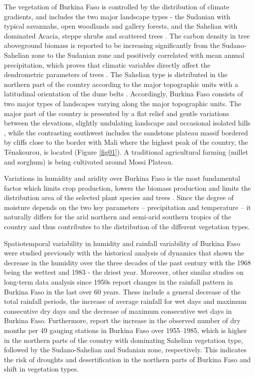 \documentclass[knowledge,article,submit,pdftex,moreauthors]{Definitions/mdpi}
\begin{document}
The vegetation of Burkina Faso is controlled by the distribution of climate gradients, and includes the two major landscape types - the Sudanian with typical savannahs, open woodlands and gallery forests, and the Sahelian with dominated Acacia, steppe shrubs and scattered trees \cite{da2010spatial}. The carbon density in tree aboveground biomass is reported to be increasing significantly from the Sudano-Sahelian zone to the Sudanian zone and positively correlated with mean annual precipitation, which proves that climatic variables directly affect the dendrometric parameters of trees \cite{BALIMA2021100123}. The Sahelian type is distributed in the northern part of the country according to the major topographic units with a latitudinal orientation of the dune belts \cite{Ballouche}. Accordingly, Burkina Faso consists of two major types of landscapes varying along the major topographic units. The major part of the country is presented by a flat relief and gentle variations between the elevations, slightly undulating landscape and occasional isolated hills \cite{Nebie}, while the contrasting southwest includes the sandstone plateau massif bordered by cliffs close to the border with Mali where the highest peak of the country, the Ténakourou, is located (Figure \ref{fig01}). A traditional agricultural farming (millet and sorghum) is being cultivated around Mossi Plateau. 

Variations in humidity and aridity over Burkina Faso is the most fundamental factor which limits crop production, lowers the biomass production and limits the distribution area of the selected plant species and trees \cite{dimobe2020climate,ADJONOU2020e04031,DIMOBE2020104237}. Since the degree of moisture depends on the two key parameters -- precipitation and temperature -- it naturally differs for the arid northern and semi-arid southern tropics of the country and thus contributes to the distribution of the different vegetation types. 

Spatiotemporal variability in humidity and rainfall variability of Burkina Faso were studied previously \cite{OGUNTUNDE20061180} with the historical analysis of dynamics that shown the decrease in the humidity over the three decades of the past century with the 1968 being the wettest and 1983 - the driest year. Moreover, other similar studies on long-term data analysis since 1950s \cite{Longueville} report changes in the rainfall pattern in Burkina Faso in the last over 60 years. These include a general decrease of the total rainfall periods, the increase of average rainfall for wet days and maximum consecutive dry days and the decrease of maximum consecutive wet days in Burkina Faso. Furthermore, \cite{BELEMTOUGRI2021100908} report the increase in the observed number of dry months per 49 gauging stations in Burkina Faso over 1955--1985, which is higher in the northern parts of the country with dominating Sahelian vegetation type, followed by the Sudano-Sahelian and Sudanian zone, respectively. This indicates the risk of droughts and desertification in the northern parts of Burkina Faso and shift in vegetation types. 
\end{document}
